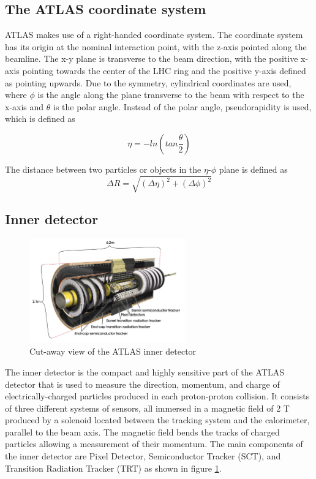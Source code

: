 \subsection{The ATLAS coordinate system}
\label{atlascoordinate}
ATLAS makes use of a right-handed coordinate system. The coordinate system has its origin at the nominal interaction point, with the z-axis pointed along the beamline. The x-y plane is transverse to the beam direction, with the positive x-axis pointing towards the center of the LHC ring and the positive y-axis defined as pointing upwards. Due to the symmetry, cylindrical coordinates are used, where $\phi$ is the angle along the plane transverse to the beam with respect to the x-axis and $\theta$ is the polar angle. Instead of the polar angle, pseudorapidity is used, which is defined as

\begin{equation}
    \label{pseudorapidity}
    \eta = - ln ( tan \frac{\theta}{2})
\end{equation}

The distance between two particles or objects in the $\eta$-$\phi$ plane is defined as
\begin{equation}
    \label{deltaR}
    \Delta R = \sqrt{(\Delta \eta)^{2} + (\Delta \phi)^{2}}
\end{equation}


\subsection{Inner detector}

\begin{figure}[!h]
\centering
\includegraphics[width=0.6\textwidth]{ubonn-thesis/Chapters/Chapters_03/Figure/inner_detector.jpg}
\caption{ Cut-away view of the ATLAS inner detector \cite{Pequenao:1095926}}
\label{fig:atlasinnerdetector}
\end{figure}

The inner detector is the compact and highly sensitive part of the ATLAS detector that is used to measure the direction, momentum, and charge of electrically-charged particles produced in each proton-proton collision. It consists of three different systems of sensors, all immersed in a magnetic field of 2 T produced by a solenoid located between the tracking system and the calorimeter, parallel to the beam axis. The magnetic field bends the tracks of charged particles allowing a measurement of their momentum. The main components of the inner detector are Pixel Detector, Semiconductor Tracker (SCT), and Transition Radiation Tracker (TRT) as shown in figure \ref{fig:atlasinnerdetector}. 

